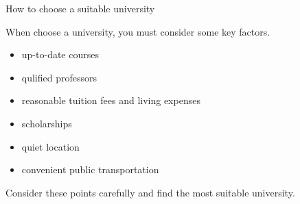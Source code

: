 \documentclass[11pt,a4paper]{article}
\begin{document}
\begin{paracol}{2}
\normalsize
\switchcolumn

\vspace{1em}




How to choose a suitable university



When choose a university, you must consider some key factors.


\begin{itemize}
    \item up-to-date courses
    \item qulified professors
\end{itemize}


\begin{itemize}
    \item reasonable tuition fees and living expenses
    \item scholarships
\end{itemize}


\begin{itemize}
    \item quiet location
    \item convenient public transportation
\end{itemize}


Consider these points carefully and find the most suitable university.














\end{paracol}
\end{document}
